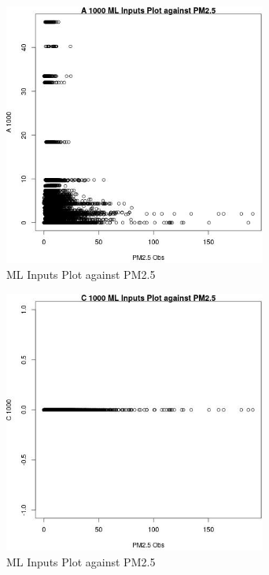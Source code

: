 \begin{figure} 
\centering  
\includegraphics[width=0.77\textwidth]{Code_Outputs/Report_ML_input_PM25_Step4_part_e_de_duplicated_aves_A_1000vPM25_Obs.jpg} 
\caption{\label{fig:Report_ML_input_PM25_Step4_part_e_de_duplicated_avesA_1000vPM25_Obs}ML Inputs Plot against PM2.5} 
\end{figure} 
 

\begin{figure} 
\centering  
\includegraphics[width=0.77\textwidth]{Code_Outputs/Report_ML_input_PM25_Step4_part_e_de_duplicated_aves_C_1000vPM25_Obs.jpg} 
\caption{\label{fig:Report_ML_input_PM25_Step4_part_e_de_duplicated_avesC_1000vPM25_Obs}ML Inputs Plot against PM2.5} 
\end{figure} 
 

